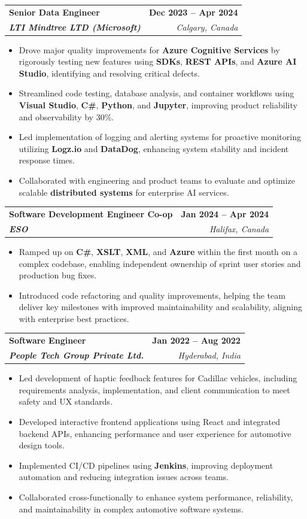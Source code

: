 \documentclass[letterpaper,11pt]{article}
\makeatletter
\newcommand{\resumeItem}[1]{
  \item\small{
    {#1 \vspace{-2pt}}
  }
}
\newcommand{\resumeSubheading}[4]{
  \vspace{-2pt}\item
    \begin{tabular*}{1.0\textwidth}[t]{l@{\extracolsep{\fill}}r}
      \textbf{#1} & \textbf{\small #2} \\
      \textit{\small#3} & \textit{\small #4} \\
    \end{tabular*}\vspace{-7pt}
}
\newcommand{\resumeItemListStart}{\begin{itemize}}
\newcommand{\resumeItemListEnd}{\end{itemize}\vspace{-5pt}}
\makeatother
\begin{document}
    \resumeSubheading
      {\textbf{Senior Data Engineer}}{\textbf{Dec 2023 -- Apr 2024}}
      {\textbf{LTI Mindtree LTD (Microsoft)}}{Calgary, Canada}
      \resumeItemListStart
        \resumeItem{Drove major quality improvements for \textbf{Azure Cognitive Services} by rigorously testing new features using \textbf{SDKs}, \textbf{REST APIs}, and \textbf{Azure AI Studio}, identifying and resolving critical defects.}
        \resumeItem{Streamlined code testing, database analysis, and container workflows using \textbf{Visual Studio}, \textbf{C\#}, \textbf{Python}, and \textbf{Jupyter}, improving product reliability and observability by 30\%.}
        \resumeItem{Led implementation of logging and alerting systems for proactive monitoring utilizing \textbf{Logz.io} and \textbf{DataDog}, enhancing system stability and incident response times.}
        \resumeItem{Collaborated with engineering and product teams to evaluate and optimize scalable \textbf{distributed systems} for enterprise AI services.}
      \resumeItemListEnd
    
    \resumeSubheading
      {\textbf{Software Development Engineer Co-op}}{\textbf{Jan 2024 -- Apr 2024}}
      {\textbf{ESO}}{Halifax, Canada}
      \resumeItemListStart
        \resumeItem{Ramped up on \textbf{C\#}, \textbf{XSLT}, \textbf{XML}, and \textbf{Azure} within the first month on a complex codebase, enabling independent ownership of sprint user stories and production bug fixes.}
        \resumeItem{Introduced code refactoring and quality improvements, helping the team deliver key milestones with improved maintainability and scalability, aligning with enterprise best practices.}
      \resumeItemListEnd

    \resumeSubheading
      {\textbf{Software Engineer}}{\textbf{Jan 2022 -- Aug 2022}}
      {\textbf{People Tech Group Private Ltd.}}{Hyderabad, India}
      \resumeItemListStart
        \resumeItem{Led development of haptic feedback features for Cadillac vehicles, including requirements analysis, implementation, and client communication to meet safety and UX standards.}
        \resumeItem{Developed interactive frontend applications using React and integrated backend APIs, enhancing performance and user experience for automotive design tools.}
        \resumeItem{Implemented CI/CD pipelines using \textbf{Jenkins}, improving deployment automation and reducing integration issues across teams.}
        \resumeItem{Collaborated cross-functionally to enhance system performance, reliability, and maintainability in complex automotive software systems.}
      \resumeItemListEnd
\end{document}
